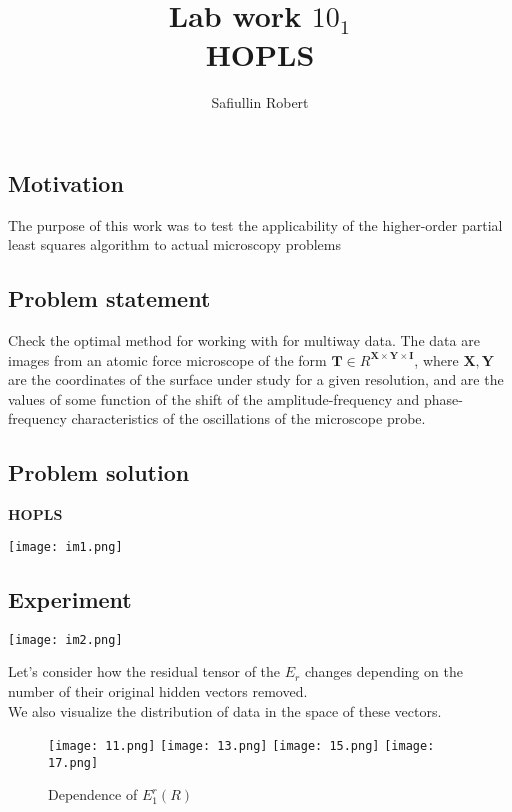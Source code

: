 \documentclass{article}
\title{Lab work $10_1$\\ HOPLS }
\author{Safiullin Robert}
\date{}
\begin{document}
\maketitle



\subsection*{Motivation}

The purpose of this work was to test the applicability of the higher-order partial least squares algorithm to actual microscopy problems

\subsection*{Problem statement}

Check the optimal method for working with for multiway data. The data are images from an atomic force microscope of the form $\mathbf{T}\in R^{\mathbf{X}\times \mathbf{Y}\times \mathbf{I}}$, where $\mathbf{X},\mathbf{Y}$ are the coordinates of the surface under study for a given resolution, and  are the values of some function of the shift of the amplitude-frequency and phase-frequency characteristics of the oscillations of the microscope probe.
\subsection*{Problem solution}
\textbf{HOPLS}
\begin{left}

\texttt{[image: im1.png]}
\end{left}


\subsection*{Experiment}
\begin{center}
    \texttt{[image: im2.png]}
\end{center}
Let's consider how the residual tensor of the $E_r$  changes depending on the number of their original hidden vectors removed. \\

We also visualize the distribution of data in the space of these vectors.
\newpage


\begin{figure}[!htb]
  \texttt{[image: 11.png]}
\endminipage\hfill
{}
  \texttt{[image: 13.png]}
\endminipage\hfill
{}%
  \texttt{[image: 15.png]}
\endminipage
{}%
  \texttt{[image: 17.png]}
\endminipage
\caption{Dependence of $\mathbf{}{E^r_1} (R)$}
\end{figure}
\end{document}
